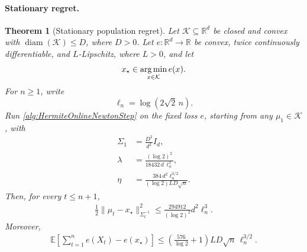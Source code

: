 \documentclass{article}
\theoremstyle{plain}
\newtheorem{theorem}{Theorem}
\theoremstyle{definition}
\theoremstyle{plain}
\newcommand{\R}{\mathbb R}
\newcommand{\argmin}{\operatornamewithlimits{arg\,min}}
\newcommand{\E}{\mathbb E}
\newcommand{\cK}{\mathcal K}
\begin{document}
\paragraph{Stationary regret.}

\begin{theorem}[Stationary population regret]
    \label{thm:hermite-ons:stationary}
    Let $\cK\subseteq\R^d$ be closed and convex with
    $\operatorname{diam}(\cK)\leq D$, where $D>0$. Let
    $e:\R^d\to\R$ be convex, twice continuously differentiable, and
    $L$-Lipschitz, where $L>0$, and let
    \[
        x_\star\in\argmin_{x\in\cK}e(x).
    \]
    For $n\geq1$, write
    \[
        \ell_n=\log(2\sqrt2\,n).
    \]
    Run \cref{alg:HermiteOnlineNewtonStep} on the fixed loss $e$,
    starting from any $\mu_1\in\cK$, with
    \begin{align}
        \Sigma_1
         & =
        \frac{D^2}{d^2}I_d,
        \label{eq:hermite-ons:stationary-sigma}
        \\
        \lambda
         & =
        \frac{(\log2)^2}
        {18432\,d\,\ell_n^2},
        \label{eq:hermite-ons:stationary-lambda}
        \\
        \eta
         & =
        \frac{384\,d^2\ell_n^{3/2}}
        {(\log2)LD\sqrt n}.
        \label{eq:hermite-ons:stationary-eta}
    \end{align}
    Then, for every $t\leq n+1$,
    \begin{align}
        \frac12
        \|\mu_t-x_\star\|_{\Sigma_t^{-1}}^2
        \leq
        \frac{294912}{(\log2)^2}
        d^2\ell_n^3.
        \label{eq:hermite-ons:stationary-focus}
    \end{align}
    Moreover,
    \begin{align}
        \E\left[
            \sum_{t=1}^n
            e(X_t)-e(x_\star)
            \right]
        \leq
        \left(
        \frac{576}{\log2}+1
        \right)
        LD\sqrt n\,\ell_n^{3/2}.
        \label{eq:hermite-ons:stationary-regret}
    \end{align}
\end{theorem}
\end{document}
